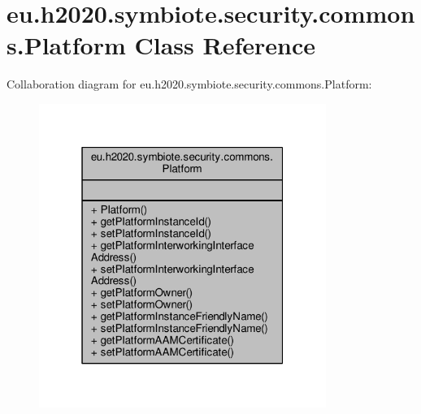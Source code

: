 \hypertarget{classeu_1_1h2020_1_1symbiote_1_1security_1_1commons_1_1Platform}{}\section{eu.\+h2020.\+symbiote.\+security.\+commons.\+Platform Class Reference}
\label{classeu_1_1h2020_1_1symbiote_1_1security_1_1commons_1_1Platform}


Collaboration diagram for eu.\+h2020.\+symbiote.\+security.\+commons.\+Platform\+:
\nopagebreak
\begin{figure}[H]
\begin{center}
\leavevmode
\includegraphics[width=265pt]{classeu_1_1h2020_1_1symbiote_1_1security_1_1commons_1_1Platform__coll__graph}
\end{center}
\end{figure}
